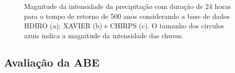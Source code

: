 \documentclass[
]{agujournal2019}
\begin{document}
\begin{figure}
\begin{minipage}{\linewidth}
{}


\end{minipage}%
\newline
\begin{minipage}{\linewidth}



\end{minipage}%

\caption{\label{fig-Figura7}Magnitude da intensidade da precipitação com
duração de 24 horas para o tempo de retorno de 500 anos considerando a
base de dados HDIRO (a); XAVIER (b) e CHIRPS (c). O tamanho dos circulos
azuis indica a magnitude da intensidade das chuvas.}

\end{figure}%

\subsection{Avaliação da ABE}\label{avaliauxe7uxe3o-da-abe}
\end{document}
